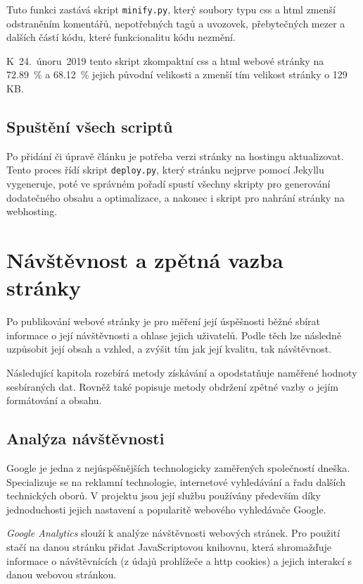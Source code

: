 \documentclass[a4paper, 12pt, twoside]{article}
\begin{document}
  Tuto funkci zastává skript \texttt{minify.py}, který soubory typu \gls{css} a \gls{html} zmenší odstraněním komentářů, nepotřebných tagů a uvozovek, přebytečných mezer a dalších částí kódu, které funkcionalitu kódu nezmění.

  K~24.~únoru~2019 tento skript zkompaktní \gls{css} a \gls{html} webové stránky na \SI{72.89}{\percent} a \SI{68.12}{\percent} jejich původní velikosti a zmenší tím velikost stránky o \num{129} KB.


  \subsection{Spuštění všech scriptů}
  Po přidání či úpravě článku je potřeba verzi stránky na hostingu aktualizovat. Tento proces řídí skript \texttt{deploy.py}, který stránku nejprve pomocí Jekyllu vygeneruje, poté ve správném pořadí spustí všechny skripty pro generování dodatečného obsahu a optimalizace, a nakonec i skript pro nahrání stránky na webhosting.


  \section{Návštěvnost a zpětná vazba stránky}
  Po publikování webové stránky je pro měření její úspěšnosti běžné sbírat informace o její návštěvnosti a ohlase jejich uživatelů. Podle těch lze následně uzpůsobit její obsah a vzhled, a zvýšit tím jak její kvalitu, tak návštěvnost.

  Následující kapitola rozebírá metody získávání a opodstatňuje naměřené hodnoty sesbíraných dat. Rovněž také popisuje metody obdržení zpětné vazby o jejím formátování a obsahu.


  \subsection{Analýza návštěvnosti}
  Google je jedna z nejúspěšnějších technologicky zaměřených společností dneška. Specializuje se na reklamní technologie, internetové vyhledávání a řadu dalších technických oborů. V projektu jsou její službu používány především díky jednoduchosti jejich nastavení a popularitě webového vyhledávače Google.

  \emph{Google Analytics} slouží k analýze návštěvnosti webových stránek. Pro použití stačí na danou stránku přidat JavaScriptovou knihovnu, která shromažďuje informace o návštěvnících (z údajů prohlížeče a \gls{http} cookies) a jejich interakcí s danou webovou stránkou.
\end{document}
